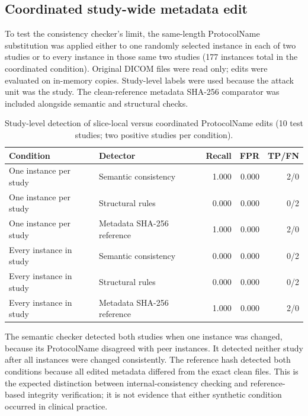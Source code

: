 \documentclass[journal]{IEEEtran}
\begin{document}
  \subsection{Coordinated study-wide metadata edit}
  To test the consistency checker's limit, the same-length ProtocolName substitution was applied either to one randomly selected instance in each of two studies or to every instance in those same two studies (177 instances total in the coordinated condition). Original DICOM files were read only; edits were evaluated on in-memory copies. Study-level labels were used because the attack unit was the study. The clean-reference metadata SHA-256 comparator was included alongside semantic and structural checks.

  \begin{table}[t]
  \caption{Study-level detection of slice-local versus coordinated ProtocolName edits (10 test studies; two positive studies per condition).}
  \label{tab:coordinated}
  \centering\scriptsize
  \begin{tabular}{llrrr}
  \toprule
  Condition & Detector & Recall & FPR & TP/FN \\
  \midrule
  One instance per study & Semantic consistency & 1.000 & 0.000 & 2/0 \\
  One instance per study & Structural rules & 0.000 & 0.000 & 0/2 \\
  One instance per study & Metadata SHA-256 reference & 1.000 & 0.000 & 2/0 \\
  Every instance in study & Semantic consistency & 0.000 & 0.000 & 0/2 \\
  Every instance in study & Structural rules & 0.000 & 0.000 & 0/2 \\
  Every instance in study & Metadata SHA-256 reference & 1.000 & 0.000 & 2/0 \\
  \bottomrule
  \end{tabular}
  \end{table}

  The semantic checker detected both studies when one instance was changed, because its ProtocolName disagreed with peer instances. It detected neither study after all instances were changed consistently. The reference hash detected both conditions because all edited metadata differed from the exact clean files. This is the expected distinction between internal-consistency checking and reference-based integrity verification; it is not evidence that either synthetic condition occurred in clinical practice.
  
\end{document}
